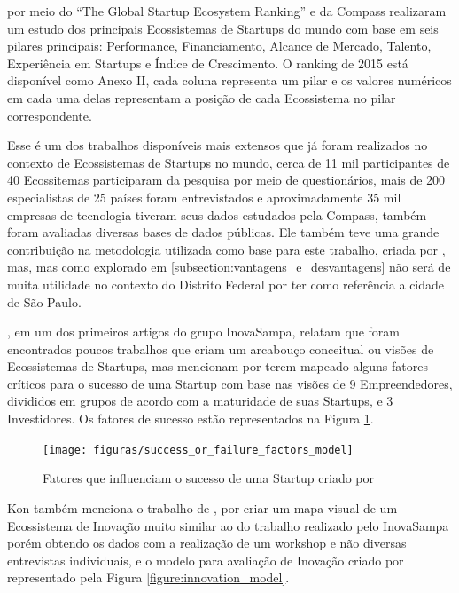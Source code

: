  por meio do ``The Global Startup Ecosystem Ranking'' e da Compass realizaram um estudo dos principais Ecossistemas de Startups do mundo com base em seis pilares principais: Performance, Financiamento, Alcance de Mercado, Talento, Experiência em Startups e Índice de Crescimento. O ranking de 2015 está disponível como Anexo II, cada coluna representa um pilar e os valores numéricos em cada uma delas representam a posição de cada Ecossistema no pilar correspondente. 

Esse é um dos trabalhos disponíveis mais extensos que já foram realizados no contexto de Ecossistemas de Startups no mundo, cerca de 11 mil participantes de 40 Ecossitemas participaram da pesquisa por meio de questionários, mais de 200 especialistas de 25 países foram entrevistados e aproximadamente 35 mil empresas de tecnologia tiveram seus dados estudados pela Compass, também foram avaliadas diversas bases de dados públicas. Ele também teve uma grande contribuição na metodologia utilizada como base para este trabalho, criada por , mas, mas como explorado em \ref{subsection:vantagens_e_desvantagens} não será de muita utilidade no contexto do Distrito Federal por ter como referência a cidade de São Paulo.

, em um dos primeiros artigos do grupo InovaSampa, relatam que foram encontrados poucos trabalhos que criam um arcabouço conceitual ou visões de Ecossistemas de Startups, mas mencionam  por terem mapeado alguns fatores críticos para o sucesso de uma Startup com base nas visões de 9 Empreendedores, divididos em grupos de acordo com a maturidade de suas Startups, e 3 Investidores. Os fatores de sucesso estão representados na Figura \ref{figure:success_or_failure_factors_model}.

\begin{figure}[!htb]
\centering
\texttt{[image: figuras/success\_or\_failure\_factors\_model]}
\caption{Fatores que influenciam o sucesso de uma Startup criado por }
\label{figure:success_or_failure_factors_model}
\end{figure}

Kon também menciona o trabalho de , por criar um mapa visual de um Ecossistema de Inovação muito similar ao do trabalho realizado pelo InovaSampa porém obtendo os dados com a realização de um workshop e não diversas entrevistas individuais, e o modelo para avaliação de Inovação criado por  representado pela Figura \ref{figure:innovation_model}. 

